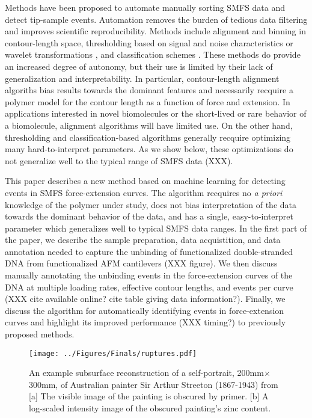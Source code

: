 \documentclass[%
  aip,12pt,tightenlines,
  amsthm,
 amsmath,amssymb
]{article}
\newcommand{\fLabel}[1]{\label{figure:#1}}
\newcommand{\pcaption}[1]{\caption{\noindent#1}}
\newcommand{\pl}[0]{\vspace{6pt}}
\newcommand{\pEndF}[0]{ \\ }
\newcommand{\pStartF}[0]{ }
\newcommand{\singlemol}[0]{SMFS}
\begin{document}
Methods have been proposed to automate manually sorting \singlemol{} data and detect tip-sample events. Automation removes the burden of tedious data filtering and improves scientific reproducibility. Methods include alignment and binning in contour-length space\cite{kuhn_automated_2005,bosshart_reference-free_2012}, thresholding based on signal and noise characteristics \cite{gergely_semi-automatized_2001,roduit_openfovea:_2012} or wavelet transformations \cite{garcia-masso_automated_2016,benitez_searching_2017}, and classification schemes \cite{kasas_fuzzy_2000}. These methods do provide an increased degree of autonomy, but their use is limited by their lack of generalization and interpretability. In particular, contour-length alignment algoriths bias results towards the dominant features and necessarily recquire a polymer model for the contour length as a function of force and extension. In applications interested in novel biomolecules or the short-lived or rare behavior of a biomolecule, alignment algorithms will have limited use.  On the other hand, thresholding and classification-based algorithms generally recquire optimizing many hard-to-interpret parameters. As we show below, these optimizations do not generalize well to the typical range of \singlemol{} data (XXX).\pl

This paper describes a new method based on machine learning for detecting events in \singlemol{} force-extension curves.  The algorithm recquires no \emph{a priori} knowledge of the polymer under study, does not bias interpretation of the data towards the dominant behavior of the data, and has a single, easy-to-interpret parameter which generalizes well to typical \singlemol{} data ranges.  In the first part of the paper, we describe the sample preparation, data acquistition, and data annotation needed to capture the unbinding of functionalized double-stranded DNA from functionalized AFM cantilevers (XXX figure). We then discuss manually annotating the unbinding events in the force-extension curves of the DNA at multiple loading rates, effective contour lengths, and events per curve (XXX cite available online? cite table giving data information?). Finally, we discuss the algorithm for automatically identifying events in force-extension curves and highlight its improved performance (XXX timing?) to previously proposed methods. \pl



\begin{figure}
\centering
\texttt{[image: ../Figures/Finals/ruptures.pdf]}%
\pcaption{\noindent\fLabel{Cartoon}\pStartF An example subsurface reconstruction of a self-portrait, 200mm$\times$300mm, of Australian painter Sir Arthur Streeton (1867-1943) from \citet{howard_high-definition_2012} [a] The visible image of the painting is obscured by primer. [b] A log-scaled intensity image of the obscured painting's zinc content. \pEndF }
\end{figure}
\end{document}
